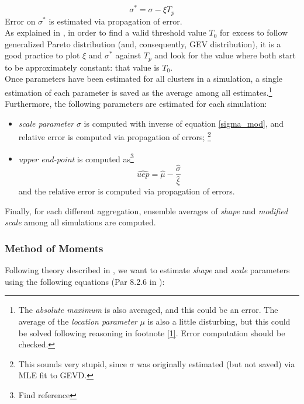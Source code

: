 \documentclass{article}
\begin{document}
\begin{equation} \label{sigma_mod}
\sigma^*=\sigma-\xi T_p
\end{equation}
Error on $\sigma^*$ is estimated via propagation of error.\\
As explained in \cite{Coles}, in order to find a valid threshold value $T_0$ for excess to follow generalized Pareto distribution (and, consequently, GEV distribution), it is a good practice to plot $\xi$ and $\sigma^*$ against $T_p$ and look for the value where both start to be approximately constant: that value is $T_0$.\\
Once parameters have been estimated for all clusters in a simulation, a single estimation of each parameter is saved as the average among all estimates.\footnote{The \textit{absolute maximum} is also averaged, and this could be an error. The average of the \textit{location parameter} $\mu$ is also a little disturbing, but this could be solved following reasoning in footnote \ref{1}. Error computation should be checked.\label{fn2}}
Furthermore, the following parameters are estimated for each simulation:

\begin{itemize}
	\item \textit{scale parameter} $\sigma$ is computed with inverse of equation \ref{sigma_mod}, and relative error is computed via propagation of errors; \footnote{This sounds very stupid, since $\sigma$ was originally estimated (but not saved) via MLE fit to GEVD.\label{fn3}}
	\item \textit{upper end-point} is computed as\footnote{Find reference}
	\begin{equation}
	\hat{uep}=\hat{\mu}-\frac{\hat{\sigma}}{\hat{\xi}}
	\end{equation}
	and the relative error is computed via propagation of errors.
	
\end{itemize}
Finally, for each different aggregation, ensemble averages of \textit{shape} and \textit{modified scale} among all simulations are computed.

\subsubsection{Method of Moments}

Following theory described in \cite{LucariniExtremesBook}, we want to estimate \textit{shape} and \textit{scale} parameters using the following equations (Par 8.2.6 in \cite{LucariniExtremesBook}):
\end{document}
